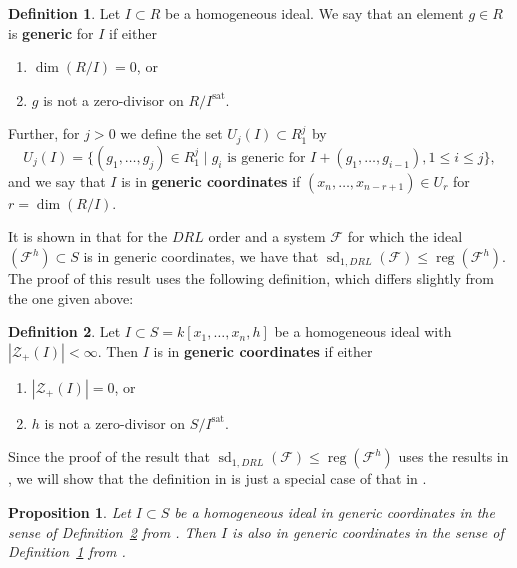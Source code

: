 \documentclass[11pt]{article}
\newcommand{\F}{\mathcal{F}}
\newcommand{\sat}{^{\text{sat}}}
\DeclareMathOperator{\sd}{sd}
\DeclareMathOperator{\reg}{reg}
\newtheorem{proposition}{Proposition}
\theoremstyle{definition}
\newtheorem{definition}{Definition}
\begin{document}
\begin{definition}\label{def:genA}
	Let $I \subset R$ be a homogeneous ideal. We say that an element $g \in R$ is \textbf{generic} for $I$ if either \begin{enumerate}[noitemsep, label = (\arabic*)]
		\item $\dim(R/I) = 0$, or
		\item $g$ is not a zero-divisor on $R/I\sat$. 
	\end{enumerate} Further, for $j > 0$ we define the set $U_j(I) \subset R_1^j$ by \[ U_j(I) = \{(g_1, \dots, g_j) \in R_1^j \mid g_i \text{ is generic for } I + (g_1, \dots, g_{i - 1}), 1 \leq i \leq j\}, \] and we say that $I$ is in \textbf{generic coordinates} if $(x_n, \dots, x_{n - r + 1}) \in U_r$ for $r = \dim(R/I)$. 
\end{definition}


It is shown in \cite{caminata2020solving} that for the $DRL$ order and a system $\F$ for which the ideal $(\F^h) \subset S$ is in generic coordinates, we have that $\sd_{1,DRL}(\F) \leq \reg(\F^h)$. The proof of this result uses the following definition, which differs slightly from the one given above:


\begin{definition}\label{def:genB}
	Let $I \subset S = k[x_1, \dots, x_n, h]$ be a homogeneous ideal with $|\mathcal{Z}_+(I)| < \infty$. Then $I$ is in \textbf{generic coordinates} if either \begin{enumerate}[noitemsep, label = (\roman*)]
		\item $|\mathcal{Z}_+(I)| = 0$, or
		\item $h$ is not a zero-divisor on $S/I\sat$. 
	\end{enumerate}
\end{definition}


Since the proof of the result that $\sd_{1, DRL}(\F) \leq \reg(\F^h)$ uses the results in \cite{bayer1987criterion}, we will show that the definition in \cite{caminata2020solving} is just a special case of that in \cite{bayer1987criterion}. 


\begin{proposition}
	Let $I \subset S$ be a homogeneous ideal in generic coordinates in the sense of Definition~\ref{def:genB} from \cite{caminata2020solving}. Then $I$ is also in generic coordinates in the sense of Definition~\ref{def:genA} from \cite{bayer1987criterion}. 
\end{proposition}
\end{document}
